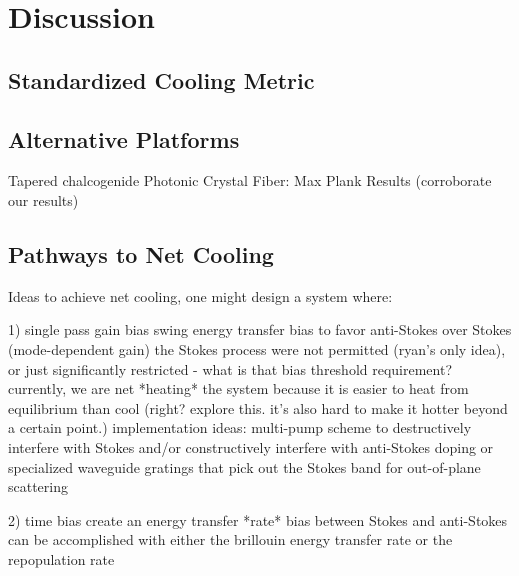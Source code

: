 
\section{Discussion}
\label{Cooling:sec:Discussion}

\subsection{Standardized Cooling Metric}
\label{Cooling:subsec:StandardizedCoolingMetric}


\subsection{Alternative Platforms}
\label{Cooling:subsec:AlternativePlatforms}

Tapered chalcogenide Photonic Crystal Fiber: Max Plank Results (corroborate our results)

\subsection{Pathways to Net Cooling}
\label{Cooling:subsec:PathwaystoNetCooling}

Ideas to achieve net cooling, one might design a system where:

1) single pass gain bias
     swing energy transfer bias to favor anti-Stokes over Stokes (mode-dependent gain)
     the Stokes process were not permitted (ryan's only idea), or just significantly restricted - what is that bias threshold requirement?
     currently, we are net *heating* the system because it is easier to heat from equilibrium than cool (right? explore this. it's also hard to make it hotter beyond a certain point.)
     implementation ideas:
       multi-pump scheme to destructively interfere with Stokes and/or constructively interfere with anti-Stokes
       doping or specialized waveguide gratings that pick out the Stokes band for out-of-plane scattering

2) time bias
     create an energy transfer *rate* bias between Stokes and anti-Stokes
     can be accomplished with either the brillouin energy transfer rate or the repopulation rate

